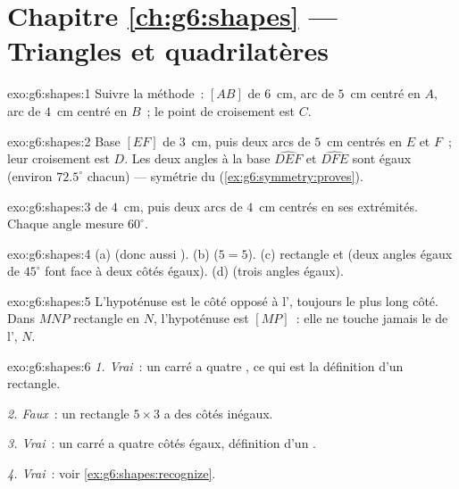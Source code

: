 \section*{Chapitre \ref{ch:g6:shapes} --- Triangles et quadrilatères}

\begin{solution}{exo:g6:shapes:1}
Suivre la méthode~:  $[AB]$ de $6$~cm, arc de  $5$~cm
centré en $A$, arc de  $4$~cm centré en $B$~; le point de
croisement est $C$.
\end{solution}

\begin{solution}{exo:g6:shapes:2}
Base $[EF]$ de $3$~cm, puis deux arcs de  $5$~cm centrés en $E$
et $F$~; leur croisement est $D$. Les deux angles à la base
$\widehat{DEF}$ et $\widehat{DFE}$ sont égaux (environ $72.5^\circ$
chacun) --- symétrie du 
(\cref{ex:g6:symmetry:proves}).
\end{solution}

\begin{solution}{exo:g6:shapes:3}
 de $4$~cm, puis deux arcs de  $4$~cm centrés en ses
extrémités. Chaque angle mesure $60^\circ$.
\end{solution}

\begin{solution}{exo:g6:shapes:4}
(a)  (donc aussi ). \quad
(b)  ($5 = 5$). \quad
(c) rectangle et  (deux angles égaux de $45^\circ$ font face à
deux côtés égaux). \quad
(d)  (trois angles égaux).
\end{solution}

\begin{solution}{exo:g6:shapes:5}
L'hypoténuse est le côté opposé à l', toujours le plus long
côté. Dans $MNP$ rectangle en $N$, l'hypoténuse est $[MP]$~: elle ne
touche jamais le  de l', $N$.
\end{solution}

\begin{solution}{exo:g6:shapes:6}
\emph{1. Vrai}~: un carré a quatre , ce qui est la
définition d'un rectangle.

\emph{2. Faux}~: un rectangle $5 \times 3$ a des côtés inégaux.

\emph{3. Vrai}~: un carré a quatre côtés égaux, définition d'un
.

\emph{4. Vrai}~: voir \cref{ex:g6:shapes:recognize}.
\end{solution}

